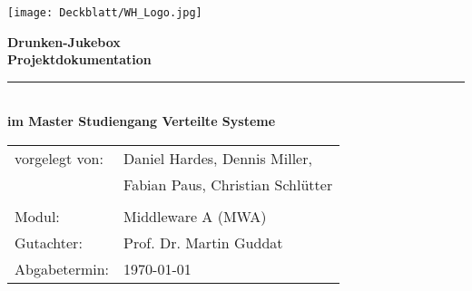 \thispagestyle{plain}
\begin{titlepage}

\begin{center}

\texttt{[image: Deckblatt/WH\_Logo.jpg]}

\vspace{2cm}

\Huge{\textbf{Drunken-Jukebox}}\\[1.5ex]
\Large{\textbf{Projektdokumentation}}
\rule{\textwidth}{0.4pt}\\[3.0ex]

\large{\textbf{im Master Studiengang Verteilte Systeme}}\\[3.0ex]

\normalsize
\begin{tabular}{ll}\\
	vorgelegt von: 
	& \quad Daniel Hardes, Dennis Miller, \\[1.2ex]
	& \quad Fabian Paus, Christian Schlütter\\[1.2ex]
	& \quad \\[1.2ex]
	Modul:  & \quad Middleware A (MWA) \\[1.2ex]
	Gutachter:  & \quad Prof. Dr. Martin Guddat \\[1.2ex]
	Abgabetermin:  & \quad \today\\[1.2ex]
\end{tabular}

\end{center}

\end{titlepage}
